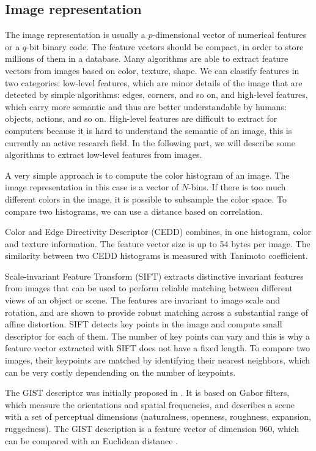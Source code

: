 \subsection{Image representation}
The image representation is usually a $p$-dimensional vector of numerical features or a $q$-bit binary code. The feature vectors should be compact, in order to store millions of them in a database. Many algorithms are able to extract feature vectors from images based on color, texture, shape. We can classify features in two categories: low-level features, which are minor details of the image that are detected by simple algorithms: edges, corners, and so on, and high-level features, which carry more semantic and thus are better understandable by humans: objects, actions, and so on. High-level features are difficult to extract for computers because it is hard to understand the semantic of an image, this is currently an active research field. In the following part, we will describe some algorithms to extract low-level features from images.

A very simple approach is to compute the color histogram of an image. The image representation in this case is a vector of $N$-bins. If there is too much different colors in the image, it is possible to subsample the color space. To compare two histograms, we can use a distance based on correlation.

Color and Edge Directivity Descriptor (CEDD) \cite{chatzichristofis2008cedd} combines, in one histogram, color and texture information. The feature vector size is up to 54 bytes per image. The similarity between two CEDD histograms is measured with Tanimoto coefficient.

Scale-invariant Feature Transform (SIFT) \cite{lowe2004distinctive} extracts distinctive invariant features from images that can be used to perform reliable matching between different views of an object or scene. The features are invariant to image scale and rotation, and are shown to provide robust matching across a substantial range of affine distortion. SIFT detects key points in the image and compute small descriptor for each of them. The number of key points can vary and this is why a feature vector extracted with SIFT does not have a fixed length. To compare two images, their keypoints are matched by identifying their nearest neighbors, which can be very costly dependending on the number of keypoints.

The GIST descriptor was initially proposed in \cite{oliva2001modeling}. It is based on Gabor filters, which measure the orientations and spatial frequencies, and describes a scene with a set of perceptual dimensions (naturalness, openness, roughness, expansion, ruggedness). The GIST description is a feature vector of dimension 960, which can be compared with an Euclidean distance \cite{douze2009evaluation}.

